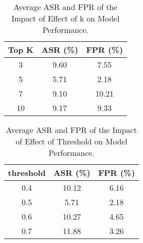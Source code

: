 \begin{table}[htbp]
    \centering
    \small
    \setlength{\tabcolsep}{7mm}
    \begin{tabular}{@{}ccc@{}}
    \toprule
    \textbf{Top K} & \textbf{ASR (\%)} & \textbf{FPR (\%)} \\ \midrule
        3  & 9.60  & 7.55   \\
        5  & {5.71}  & {2.18}   \\
        7  & 9.10  & 10.21  \\
        10 & 9.17   & 9.33  \\ \bottomrule
    \end{tabular}
    \caption{Average ASR and FPR of the Impact of Effect of k on Model Performance.}
    \label{fig_k}
\end{table}

\begin{table}[htbp]
    \centering
    \small
    \setlength{\tabcolsep}{7mm}
    \begin{tabular}{@{}ccc@{}}
    \toprule
    \textbf{threshold} & \textbf{ASR (\%)} & \textbf{FPR (\%)} \\ \midrule
    0.4                & 10.12      & 6.16       \\
    0.5                & {5.71}       & {2.18}       \\
    0.6                & 10.27     & 4.65      \\
    0.7                & 11.88     & 3.26      \\ \bottomrule
    \end{tabular}
    \caption{Average ASR and FPR of the Impact of Effect of Threshold on Model Performance.}
    \label{fig_threshold}
\end{table}